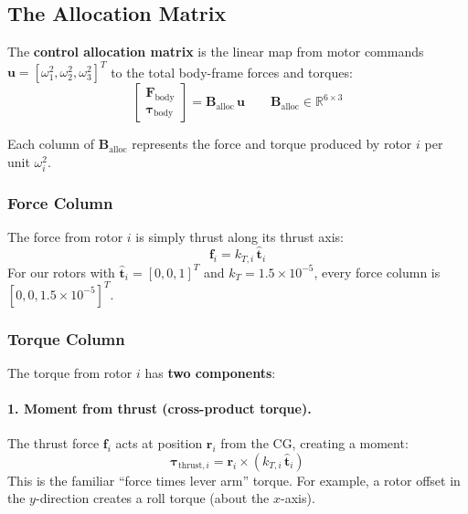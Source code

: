 \documentclass[12pt, a4paper]{article}
\newcommand{\R}{\mathbb{R}}
\newcommand{\bu}{\bm{u}}
\newcommand{\btau}{\bm{\tau}}
\newcommand{\bF}{\bm{F}}
\newcommand{\bB}{\bm{B}}
\begin{document}
\subsection{The Allocation Matrix}

The \textbf{control allocation matrix} is the linear map from motor commands $\bu = [\omega_1^2, \omega_2^2, \omega_3^2]^T$ to the total body-frame forces and torques:
\begin{equation}
    \begin{bmatrix} \bF_{\text{body}} \\ \btau_{\text{body}} \end{bmatrix}
    = \bB_{\text{alloc}} \, \bu
    \qquad
    \bB_{\text{alloc}} \in \R^{6 \times 3}
\end{equation}

Each column of $\bB_{\text{alloc}}$ represents the force and torque produced by rotor $i$ per unit $\omega_i^2$.

\subsubsection{Force Column}

The force from rotor $i$ is simply thrust along its thrust axis:
\begin{equation}
    \bm{f}_i = k_{T,i} \, \hat{\bm{t}}_i
\end{equation}
For our rotors with $\hat{\bm{t}}_i = [0, 0, 1]^T$ and $k_T = 1.5 \times 10^{-5}$, every force column is $[0, 0, 1.5 \times 10^{-5}]^T$.

\subsubsection{Torque Column}

The torque from rotor $i$ has \textbf{two components}:

\paragraph{1. Moment from thrust (cross-product torque).}  The thrust force $\bm{f}_i$ acts at position $\bm{r}_i$ from the CG, creating a moment:
\begin{equation}
    \btau_{\text{thrust},i} = \bm{r}_i \times (k_{T,i} \, \hat{\bm{t}}_i)
\end{equation}
This is the familiar ``force times lever arm'' torque.  For example, a rotor offset in the $y$-direction creates a roll torque (about the $x$-axis).
\end{document}
